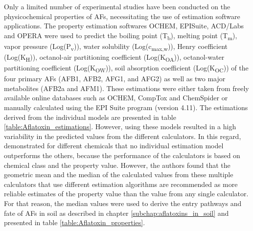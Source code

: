 Only a limited number of experimental studies have been conducted on the physicochemical properties of AFs, necessitating the use of estimation software applications. The property estimation softwares OCHEM, EPISuite, ACD/Labs and OPERA were used to predict the boiling point (T\textsubscript{b}), melting point (T\textsubscript{m}), vapor pressure  (Log(P\textsubscript{v})), water solubility (Log(c\textsubscript{max,w})), Henry coefficient (Log(K\textsubscript{H})), octanol-air partitioning coefficient (Log(K\textsubscript{OA})), octanol-water partitioning coefficient (Log(K\textsubscript{OW})),   soil absorption coefficient (Log(K\textsubscript{OC})) of the four primary AFs (AFB1, AFB2, AFG1, and AFG2) as well as two major metabolites (AFB2a and AFM1). These estimations were either taken from freely available online databases such as OCHEM, CompTox and ChemSpider or manually calculated using the EPI Suite program (version 4.11). The estimations derived from the individual models are presented in table \ref{table:Aflatoxin_estimations}. However, using these models resulted in a high variability in the predicted values from the different calculators. In this regard, \citet{tebes2018demonstration} demonstrated for different chemicals that no individual estimation model outperforms the others, because the performance of the calculators is based on chemical class and the property value. However, the authors found that the geometric mean  and the median of the calculated values from these multiple calculators that use different estimation algorithms are recommended as more reliable estimates of the property value than the value from any single calculator. For that reason, the median values were used to derive the entry pathways and fate of AFs in soil as described in chapter \ref{subchap:aflatoxins_in_soil} and presented in table \ref{table:Aflatoxin_properties}.

 

\clearpage
